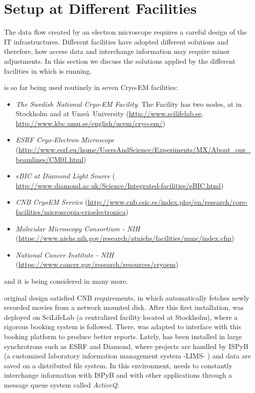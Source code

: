 \section{\scipion Setup at Different Facilities}

The data flow created by an electron microscope requires a careful design of the IT infrastructures.  Different facilities have adopted different solutions and therefore, how \scipion  access data and interchange information may require minor adjustments. In this section we discuss  the  solutions applied by the different facilities in which \scipion is running.

\scipion is so far being used routinely in seven Cryo-EM facilities:
\begin{itemize}
 \itemsep0em 

 \item \emph{The Swedish National Cryo-EM Facility}. The Facility has two nodes, at \scilifelab in Stockholm and at Ume\aa\ University (\url{http://www.scilifelab.se}, \url{http://www.kbc.umu.se/english/ucem/cryo-em/})
 \item \emph{ESRF Cryo-Electron Microscope} (\url{http://www.esrf.eu/home/UsersAndScience/Experiments/MX/About_our_beamlines/CM01.html})
 \item \emph{eBIC at Diamond Light Source} ( \url{http://www.diamond.ac.uk/Science/Integrated-facilities/eBIC.html})
 \item \emph{CNB CryoEM Service} (\url{http://www.cnb.csic.es/index.php/en/research/core-facilities/microscopia-crioelectronica})
 \item \emph{Molecular Microscopy Consortium - NIH} (\url{https://www.niehs.nih.gov/research/atniehs/facilities/mmc/index.cfm})
 \item \emph{National Cancer Institute - NIH} (\url{https://www.cancer.gov/research/resources/cryoem})
 
\end{itemize}
and it is being considered in many more.

\scipion original design satisfied CNB requirements, in which \scipion automatically fetches newly recorded movies from a network mounted disk. After this first installation, \scipion was deployed on SciLifeLab (a centralized facility located at Stockholm), where a rigorous booking system is followed. There, \scipion was adapted to interface with this booking platform to produce better reports. Lately,  \scipion has been installed in  large synchrotrons  such as ESRF and Diamond,  where projects are handled by ISPyB (a customized laboratory information management system -LIMS- \citep{Delageniere2011:ispb}) and data are saved on a distributed file system. %
In this environment, \scipion needs to constantly interchange information with ISPyB and with other applications through a message queue system called \emph{ActiveQ}.%

